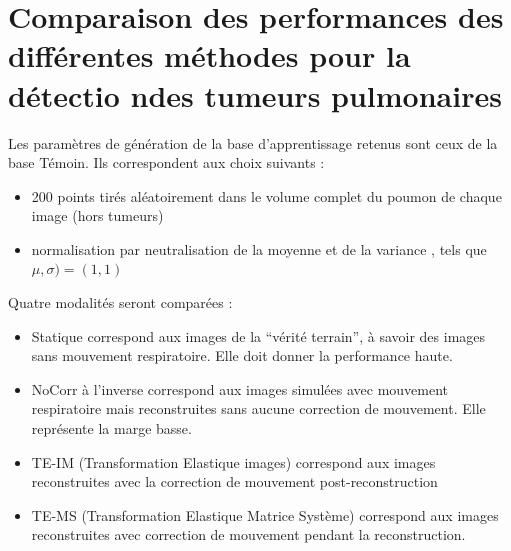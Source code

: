 \FloatBarrier

\section{Comparaison des performances des différentes méthodes pour la détectio ndes tumeurs pulmonaires}

Les paramètres de génération de la base d'apprentissage retenus sont ceux de la base Témoin. Ils correspondent aux choix suivants :

\begin{itemize}
 \item 200 points tirés aléatoirement dans le volume complet du poumon de chaque image (hors tumeurs)
 \item normalisation par neutralisation de la moyenne et de la variance , tels que $\mu, \sigma) = (1,1)$
\end{itemize}


Quatre modalités seront comparées :

\begin{itemize}
 \item Statique correspond aux images de la ``vérité terrain'', à savoir des images sans mouvement respiratoire. Elle doit donner la performance haute.  
\item NoCorr à l'inverse correspond aux images simulées avec mouvement respiratoire mais reconstruites sans aucune correction de mouvement. Elle représente la marge basse. 
 \item TE-IM (Transformation Elastique images) correspond aux images reconstruites avec la correction de mouvement post-reconstruction
 \item TE-MS (Transformation Elastique Matrice Système) correspond aux images reconstruites avec correction de mouvement pendant la reconstruction.
\end{itemize}


